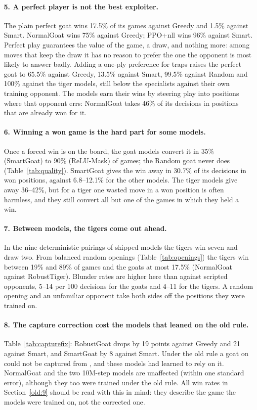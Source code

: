 \paragraph{5. A perfect player is not the best exploiter.} The plain perfect goat wins 17.5\% of its games
against Greedy and 1.5\% against Smart. NormalGoat wins 75\% against Greedy; PPO+nll wins 96\% against Smart.
Perfect play guarantees the value of the game, a draw, and nothing more: among moves that keep the draw it
has no reason to prefer the one the opponent is most likely to answer badly. Adding a one-ply preference
for traps raises the perfect goat to 65.5\% against Greedy, 13.5\% against Smart, 99.5\% against Random and 100\% against
the tiger models, still below the specialists against their own training opponent. The models earn their
wins by steering play into positions where that opponent errs: NormalGoat takes 46\% of its decisions in
positions that are already won for it.

\paragraph{6. Winning a won game is the hard part for some models.} Once a forced win is on the board, the
goat models convert it in 35\% (SmartGoat) to 90\% (ReLU-Mask) of games; the Random goat never does
(Table~\ref{tab:quality}). SmartGoat gives the win away in 30.7\% of its decisions in won positions, against
6.8--12.1\% for the other models. The tiger models give away 36--42\%, but for a tiger one wasted move in a
won position is often harmless, and they still convert all but one of the games in which they held a win.

\paragraph{7. Between models, the tigers come out ahead.} In the nine deterministic pairings of shipped models
the tigers win seven and draw two. From balanced random openings (Table~\ref{tab:openings}) the tigers win
between 19\% and 89\% of games and the goats at most 17.5\% (NormalGoat against RobustTiger). Blunder rates
are higher here than against scripted opponents, 5--14 per 100 decisions for the goats and 4--11 for the
tigers. A random opening and an unfamiliar opponent take both sides off the positions they were trained on.

\paragraph{8. The capture correction cost the models that leaned on the old rule.}
Table~\ref{tab:capturefix}: RobustGoat drops by 19 points against Greedy and 21 against Smart, and SmartGoat by
8 against Smart. Under the old rule a goat on  could not be captured from , and these models
had learned to rely on it. NormalGoat and the two 10M-step models are unaffected (within one standard
error), although they too were trained under the old rule. All win rates in Section~\ref{old:9} should be
read with this in mind: they describe the game the models were trained on, not the corrected one.

